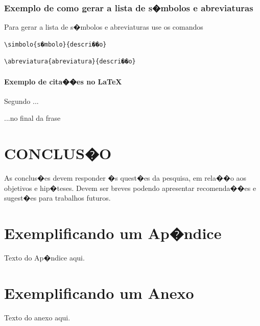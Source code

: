 \documentclass{ufscThesis} %
\begin{document}
\subsection{Exemplo de como gerar a lista de s�mbolos e abreviaturas}

Para gerar a lista de s�mbolos e abreviaturas use os comandos


\begin{lstlisting}
\simbolo{s�mbolo}{descri��o}
\end{lstlisting}

\begin{lstlisting}
\abreviatura{abreviatura}{descri��o}
\end{lstlisting}

\subsubsection{Exemplo de cita��es no \LaTeX}

Segundo  ...

...no final da frase \cite{abnt14724,BU_formatoA5}


\nocite{alves_2001,abnt10520,abnt6024,abnt14724}



\chapter{CONCLUS�O}

As conclus�es devem responder �s quest�es da pesquisa, em rela��o aos objetivos e hip�teses. Devem ser breves podendo apresentar recomenda��es e sugest�es para trabalhos futuros.




\apendice
\chapter{Exemplificando um Ap�ndice}
Texto do Ap�ndice aqui. 

\anexo
\chapter{Exemplificando um Anexo}
Texto do anexo aqui.
\end{document}
